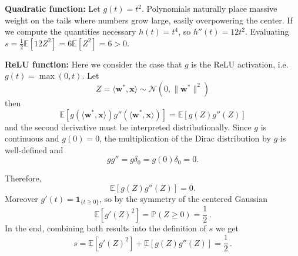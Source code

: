 {\bf Quadratic function:} Let $g(t) = t^2$. Polynomials naturally place massive weight on the tails where numbers grow large, easily overpowering the center. If we compute the quantities necessary $h(t) = t^4$, so $h''(t) = 12 t^2$. Evaluating $s = \frac{1}{2}\mathbb{E}[12Z^2] = 6\mathbb{E}[Z^2] = 6 > 0$. 



{\bf ReLU function:} Here we consider the case that $g$ is the ReLU activation, i.e. $g(t) = \max(0,t)$.
Let
\[
    Z = \langle \bm w^*, \bm x\rangle \sim \mathcal N(0, \|\bm w^*\|^2)
\]
then 
\[
    \mathbb E[g(\langle \bm w^*, \bm x\rangle) g''(\langle \bm w^*, \bm x\rangle)] = \mathbb E[g(Z) g''(Z)]
\]
and the second derivative must be interpreted distributionally. Since $g$ is continuous and $g(0) = 0$, the multiplication of the Dirac distribution by $g$ is well-defined and
\[
    gg'' = g \delta_0 = g(0) \delta_0 = 0.
\]

Therefore,
\[
    \mathbb E[g(Z) g''(Z)] = 0.
\]
Moreover $g'(t) = \bm 1_{\{t \geq 0\}}$, so by the symmetry of the centered Gaussian 
\[
    \mathbb E[g'(Z)^2] = \mathbb P(Z \geq 0) = \frac{1}{2}\, .
\]
In the end, combining both results into the definition of $s$ we get
\[
    s = \mathbb E[g'(Z)^2] + \mathbb E[g(Z)g''(Z)] = \frac{1}{2}\,.
\]